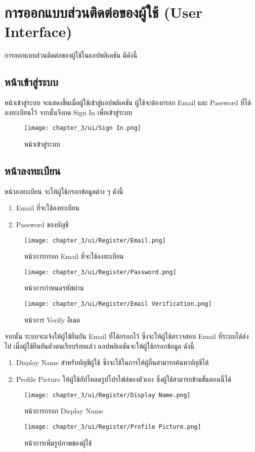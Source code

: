 \section{การออกแบบส่วนติดต่อของผู้ใช้ (User Interface)}

การออกแบบส่วนติดต่อของผู้ใช้ในแอปพลิเคชัน มีดังนี้
\subsection{หน้าเข้าสู่ระบบ}
หน้าเข้าสู่ระบบ จะแสดงขึ้นเมื่อผู้ใช้เข้าสู่แอปพลิเคชัน ผู้ใช้จะต้องกรอก Email และ Password ที่ได้ลงทะเบียนไว้ จากนั้นจึงกด Sign In เพื่อเข้าสู่ระบบ
\begin{figure}
    \texttt{[image: chapter\_3/ui/Sign In.png]}
    \caption{หน้าเข้าสู่ระบบ}
\end{figure}

\subsection{หน้าลงทะเบียน}
หน้าลงทะเบียน จะให้ผู้ใช้กรอกข้อมูลต่าง ๆ ดังนี้
\begin{enumerate}
    \item Email ที่จะใช้ลงทะเบียน
    \item Password ของบัญชี
\end{enumerate}
\begin{figure}
    \texttt{[image: chapter\_3/ui/Register/Email.png]}
    \caption{หน้าการกรอก Email ที่จะใช้ลงทะเบียน}
\end{figure}
\begin{figure}
    \texttt{[image: chapter\_3/ui/Register/Password.png]}
    \caption{หน้าการกำหนดรหัสผ่าน}
\end{figure}
\begin{figure}
    \texttt{[image: chapter\_3/ui/Register/Email Verification.png]}
    \caption{หน้าการ Verify อีเมล}
\end{figure}
\indent จากนั้น ระบบจะแจ้งให้ผู้ใช้ยืนยัน Email ที่ได้กรอกไว้ ซึ่งจะให้ผู้ใช้ตรวจสอบ Email ที่ระบบได้ส่งไป เมื่อผู้ใช้ยืนยันตัวตนเรียบร้อยแล้ว 
แอปพลิเคชันจะให้ผู้ใช้กรอกข้อมูล ดังนี้
\begin{enumerate}
    \item Display Name สำหรับบัญชีผู้ใช้ ซึ่งจะใช้ในการให้ผู้อื่นสามารถค้นหาบัญชีได้
    \item Profile Picture ให้ผู้ใช้อัปโหลดรูปโปรไฟล์ของตัวเอง ซึ่งผู้ใช้สามารถข้ามขั้นตอนนี้ได้
\end{enumerate}
\begin{figure}
    \texttt{[image: chapter\_3/ui/Register/Display Name.png]}
    \caption{หน้าการกรอก Display Name}
\end{figure}
\begin{figure}
    \texttt{[image: chapter\_3/ui/Register/Profile Picture.png]}
    \caption{หน้าการเพิ่มรูปภาพของผู้ใช้}
\end{figure}

